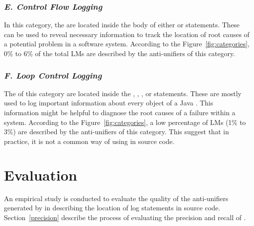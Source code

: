 \subsubsection{\emph{E. Control Flow Logging}}  \label{Exception try-block logging}
In this category, the  are located inside the body of either  or  statements. These  can be used to reveal necessary information to track the location of root causes of a potential problem in a software system. According to the Figure~\ref{fig:categories}, 0\% to 6\% of the total LMs are described by the anti-unifiers of this category.


\subsubsection{\emph{F. Loop Control Logging}}  \label{loop control logging}
The  of this category are located inside the , , , or  statements. These  are mostly used to log important information about every object of a Java . This information might be helpful to diagnose the root causes of a failure within a system. According to the Figure~\ref{fig:categories}, a low percentage of LMs (1\% to 3\%) are described by the anti-unifiers of this category. This suggest that in practice, it is not a common way of using  in source code.  


\section{Evaluation}  \label{evaluation}
An empirical study is conducted to evaluate the quality of the anti-unifiers generated by  in describing the location of log statements in source code. Section~\ref{precision} describe the process of evaluating the precision and recall of .


